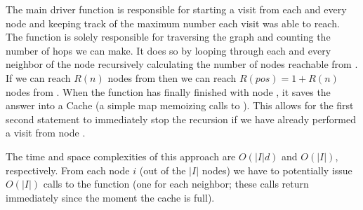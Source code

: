 The main driver function  is responsible for starting a visit from each and every node and keeping track of the maximum number each visit was able to reach.
The function  is solely responsible for traversing the graph and counting the number of hops we can make. It does so by looping through each and every neighbor  of the node  recursively calculating the number of nodes reachable from . 
If we can reach $R(n)$ nodes from  then we can reach $R(pos)=1+R(n)$ nodes from .
When the function has finally finished with node , it saves the answer into a Cache (a simple map memoizing calls to ). This allows for the first second  statement to immediately stop the recursion if we have already performed a visit from node .

The time and space complexities of this approach are $O(|I|d)$ and $O(|I|)$, respectively. From each node  $i$ (out of the $|I|$ nodes) we have to potentially issue $O(|I|)$ calls to the  function (one for each neighbor; these calls return immediately since the moment the cache is full).
